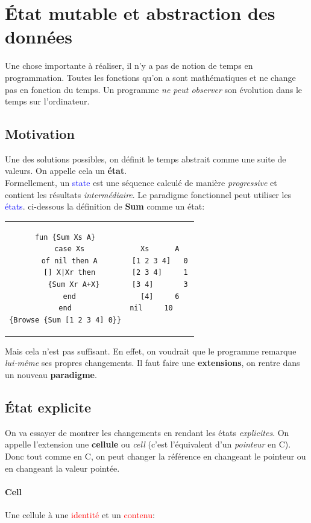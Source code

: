 \documentclass{report}
\begin{document}
\chapter{État mutable et abstraction des données}
Une chose importante à réaliser, il n'y a pas de notion de temps en programmation. Toutes les fonctions qu'on a sont mathématiques et ne change pas en fonction du temps. Un programme \textit{ne peut observer} son évolution dans le temps sur l'ordinateur.

\section{Motivation}
Une des solutions possibles, on définit le temps abstrait comme une suite de valeurs. On appelle cela un \textbf{état}. \\
Formellement, un \textcolor{blue}{state} est une séquence calculé de manière \textit{progressive} et contient les résultats \textit{intermédiaire}. Le paradigme fonctionnel peut utiliser les \textcolor{blue}{états}. ci-dessous la définition de \textbf{Sum} comme un état:
\begin{center}
\begin{tabular}{c|c}
\begin{lstlisting}[escapechar=\%]
fun {Sum Xs A}
  case Xs
  of nil then A
  [] X|Xr then
    {Sum Xr A+X}
  end
end
{Browse {Sum [1 2 3 4] 0}}
\end{lstlisting}
& \begin{lstlisting}[escapechar=\%]
Xs		A
[1 2 3 4]	0
[2 3 4]		1
[3 4]		3
[4]		6
nil		10    
\end{lstlisting}
\end{tabular}
\end{center}
Mais cela n'est pas suffisant. En effet, on voudrait que le programme remarque \textit{lui-même} ses propres changements. Il faut faire une \textbf{extensions}, on rentre dans un nouveau \textbf{paradigme}.

\section{État explicite}
On va essayer de montrer les changements en rendant les états \textit{explicites}. On appelle l'extension une \textbf{cellule} ou \textit{cell} (c'est l'équivalent d'un \textit{pointeur} en C).\\
Donc tout comme en C, on peut changer la référence en changeant le pointeur ou en changeant la valeur pointée.

\subsubsection{Cell}
Une cellule à une \textcolor{red}{identité} et un \textcolor{red}{contenu}:
\end{document}
